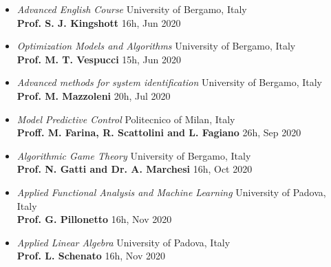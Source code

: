 \documentclass[10pt]{article}
\begin{document}
\begin{itemize}
	\item \textit{Advanced English Course} \hfill University of Bergamo, Italy\\
	\textbf{Prof. S. J. Kingshott} \hfill 16h, Jun 2020\\
	
	\item \textit{Optimization Models and Algorithms} \hfill University of Bergamo, Italy\\
	\textbf{Prof. M. T. Vespucci} \hfill 15h, Jun 2020\\
	
	\item \textit{Advanced methods for system identification} \hfill University of Bergamo, Italy\\
	\textbf{Prof. M. Mazzoleni} \hfill 20h, Jul 2020\\
	
	\item \textit{Model Predictive Control} \hfill Politecnico of Milan, Italy\\
	\textbf{Proff. M. Farina, R. Scattolini and L. Fagiano} \hfill 26h, Sep 2020\\

	\item \textit{Algorithmic Game Theory} \hfill University of Bergamo, Italy\\
	\textbf{Prof. N. Gatti and Dr. A. Marchesi} \hfill 16h, Oct 2020\\

	\item \textit{Applied Functional Analysis and Machine Learning} \hfill University of Padova, Italy\\
	\textbf{Prof. G. Pillonetto} \hfill 16h, Nov 2020\\

	\item \textit{Applied Linear Algebra} \hfill University of Padova, Italy\\
	\textbf{Prof. L. Schenato} \hfill 16h, Nov 2020\\
\end{itemize}

\vspace{6pt} %
\end{document}
